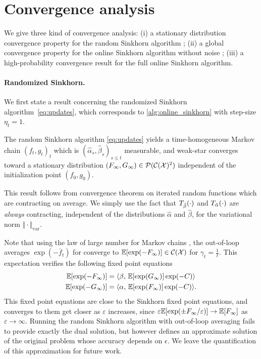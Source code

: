 

\section{Convergence analysis}

We give three kind of convergence analysis: (i) a stationary distribution convergence property for the random Sinkhorn
algorithm ; (ii) a global convergence property for the online Sinkhorn algorithm without noise ; (iii) a high-probability convergence result for the full online Sinkhorn algorithm.

\paragraph{Randomized Sinkhorn.}

We first state a result concerning the randomized Sinkhorn algorithm~\eqref{eq:updates}, which corresponds to
\autoref{alg:online_sinkhorn} with step-size $\eta_t = 1$.

\begin{proposition}\label{prop:markov}
    The random Sinkhorn algorithm \eqref{eq:updates} yields a time-homogeneous
    Markov chain ${(f_t, g_t)}_t$ which is $(\hat \alpha_s, \hat \beta_s)_{s \leq
    t}$ measurable, and weak-star converges toward a stationary distribution
    $(F_\infty, G_\infty) \in \mathcal{P}(\mathcal{C}(\mathcal{X})^2)$ independent of the initialization
    point $(f_0, g_0)$.
\end{proposition}

This result follows from \citet{diaconis_iterated} convergence theorem on
iterated random functions which are contracting on average. We simply use the
fact that $T_{\hat \beta}(\cdot)$ and $T_{\hat \alpha}(\cdot)$ are
\textit{always} contracting, independent of the distributions $\hat \alpha$ and
$\hat \beta$, for the variational norm $\Vert \cdot \Vert_{\text{var}}$.

Note that using the law of large number for Markov chains
\citep{breiman_strong_1960}, the out-of-loop averages $\exp(-\bar f_t)$ for
converge to $\mathbb{E}[\exp(-F_\infty)] \in \mathcal{C}(\mathcal{X})$ for $\gamma_t = \frac{1}{t}$. This expectation verifies the following fixed point equations
\begin{align}
    \mathbb{E}[\exp(-F_\infty)] &=
     \langle \beta,\,\mathbb{E}[\exp(G_\infty)] \exp(-C)\rangle \\
    \mathbb{E}[\exp(-G_\infty)] &=
     \langle \alpha,\,\mathbb{E}[\exp(F_\infty)] \exp(-C)\rangle.
\end{align}
This fixed point equations are close to the Sinkhorn fixed point equations, and converges to them 
get closer as $\varepsilon$ increases, since $\varepsilon \mathbb{E}[\exp(\pm F_\infty /
\varepsilon)] \to \mathbb{E}[F_\infty]$ as $\varepsilon \to \infty$. Running the random
Sinkhorn algorithm with out-of-loop averaging fails to provide exactly the dual solution, but 
however defines an approximate solution of the original problem whose accuracy depends on $\epsilon$. 
%
We leave the quantification of this approximation for future work.

